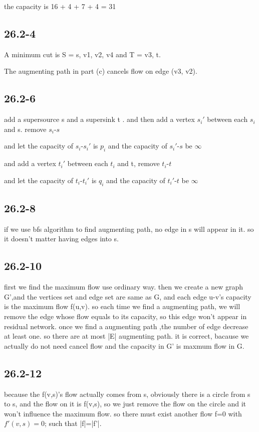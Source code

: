 \documentclass[a4paper,UTF8]{article}
\theoremstyle{definition}
\begin{document}
the capacity is 16 + 4 + 7 + 4 = 31
\subsection*{26.2-4}
A minimum cut  is S = {s, v1, v2, v4} and T = {v3, t}.

The augmenting path in part (c) cancels flow on edge (v3, v2).

\subsection*{26.2-6}
add a supersource s and a supersink t . and then add a vertex $s_i'$ between each $s_i$ and s. remove $s_i$-$s$

and let the capacity of  $s_i$-$s_i'$ is $p_i$ and the capacity of $s_i'$-$s$ be $\infty$

and add a vertex $t_i'$ between each $t_i$ and t, remove $t_i$-$t$

and let the capacity of  $t_i$-$t_i'$ is $q_i$ and the capacity of $t_i'$-$t$ be $\infty$
\subsection*{26.2-8}
if we use bfs algorithm to find augmenting path, no edge in s will appear in it.
so it doesn't matter having edges into s.
\subsection*{26.2-10}
first we find the maximum flow use ordinary way. then we create a new graph G',and the vertices set and edge set are same as G,
and each edge u-v's capacity is the maximum flow f(u,v). so each time we find a augmenting path, we will remove the edge whose
flow equals to its capacity, so this edge won't appear in residual network. once we find a augmenting path ,the number of edge decrease at least one.
so there are at most |E| augmenting path. it is correct, bacause we actually do not need cancel flow and the capacity in G' is maxmum flow in G.

\subsection*{26.2-12}
because the f(v,s)'s  flow actually comes from s, obviously  there is a circle from s to s, and the flow on it is f(v,s), so we just
remove the flow on the circle and it won't influence the maximum flow. so there must exist another flow f=0 with $f'(v,s)=0$; such that
|f|=|f'|.
\end{document}
